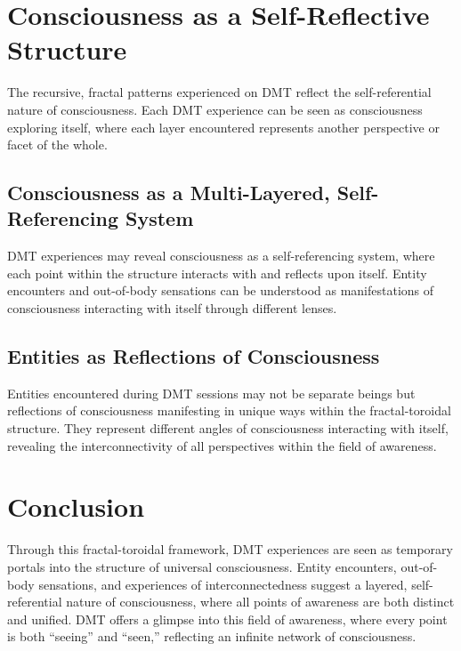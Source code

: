 \documentclass{article}
\begin{document}
\section{Consciousness as a Self-Reflective Structure}
The recursive, fractal patterns experienced on DMT reflect the self-referential nature of consciousness. Each DMT experience can be seen as consciousness exploring itself, where each layer encountered represents another perspective or facet of the whole.

\subsection{Consciousness as a Multi-Layered, Self-Referencing System}
DMT experiences may reveal consciousness as a self-referencing system, where each point within the structure interacts with and reflects upon itself. Entity encounters and out-of-body sensations can be understood as manifestations of consciousness interacting with itself through different lenses.

\subsection{Entities as Reflections of Consciousness}
Entities encountered during DMT sessions may not be separate beings but reflections of consciousness manifesting in unique ways within the fractal-toroidal structure. They represent different angles of consciousness interacting with itself, revealing the interconnectivity of all perspectives within the field of awareness.

\section{Conclusion}
Through this fractal-toroidal framework, DMT experiences are seen as temporary portals into the structure of universal consciousness. Entity encounters, out-of-body sensations, and experiences of interconnectedness suggest a layered, self-referential nature of consciousness, where all points of awareness are both distinct and unified. DMT offers a glimpse into this field of awareness, where every point is both “seeing” and “seen,” reflecting an infinite network of consciousness.
\end{document}
